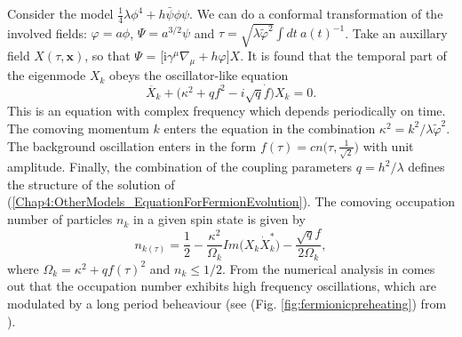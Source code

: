 \documentclass[11pt,a4paper,twoside]{book}
\begin{document}
Consider the model $ \frac{1}{4}\lambda \phi^{4} + h\bar{\psi}\phi\psi $. We can do a conformal transformation of the involved fields: $\varphi=a\phi$, $\Psi=a^{3/2}\psi$ and $\tau=\sqrt{\lambda \tilde{\varphi}^{2}}\int dt\  a(t)^{-1}$. Take an auxillary field $ X(\tau,\textbf{x}) $, so that $\Psi$ = [i$\gamma^{\mu}\nabla_{\mu} + h\varphi]X$. It is found that the temporal part of the eigenmode $ X_{k} $ obeys the oscillator-like equation \cite{Chap4:FermionPreheating}
\begin{equation}
\label{Chap4:OtherModels_EquationForFermionEvolution}
\ddot{X_{k}} + \Bigg(\kappa^{2} + qf^{2} - i\sqrt{q}\dot{f}\Bigg)X_{k}=0.
\end{equation}
This is an equation with complex frequency which depends periodically on time. The comoving momentum $ k $ enters the equation in the combination $\kappa^{2}=k^{2}/\lambda\tilde{\varphi}^{2}$. The background oscillation enters in the form $ f(\tau) = cn\Bigg(\tau,\frac{1}{\sqrt{2}}\Bigg) $ with unit amplitude. Finally, the combination of the coupling parameters  $ q=h^{2}/\lambda $ defines the structure of the solution of (\ref{Chap4:OtherModels_EquationForFermionEvolution}). The comoving occupation number of particles $ n_{k} $ in a given spin state is given by
\begin{equation}
\label{Chap4:OtherModels_OccupationNumberFermion}
n_{k(\tau)}=\frac{1}{2} - \frac{\kappa^{2}}{\Omega_{k}}Im\Bigg(X_{k}\dot{X}_{k}^{*}\Bigg) - \frac{\sqrt{q}f}{2\Omega_{k}},
\end{equation}
where $\Omega_{k}=\kappa^{2} + qf(\tau)^{2}$ and $ n_{k}\le 1/2 $. From the numerical analysis in \cite{Chap4:FermionPreheating} comes out that the occupation number exhibits high frequency oscillations, which are modulated by  a long period beheaviour (see (Fig. \ref{fig:fermionicpreheating}) from \cite{Chap4:FermionPreheating}). 
\end{document}
